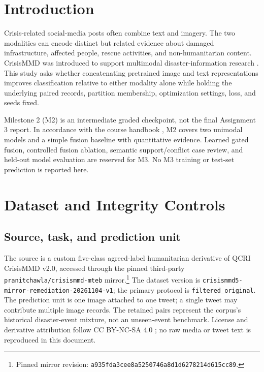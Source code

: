 \documentclass[11pt,a4paper]{article}
\newcommand{\primary}{\texttt{filtered\_original}}
\begin{document}
\section{Introduction}
Crisis-related social-media posts often combine text and imagery. The two modalities can encode distinct but related evidence about damaged infrastructure, affected people, rescue activities, and non-humanitarian content. CrisisMMD was introduced to support multimodal disaster-information research \cite{alam2018}. This study asks whether concatenating pretrained image and text representations improves classification relative to either modality alone while holding the underlying paired records, partition membership, optimization settings, loss, and seeds fixed.

Milestone 2 (M2) is an intermediate graded checkpoint, not the final Assignment 3 report. In accordance with the course handbook \cite{handbook2026}, M2 covers two unimodal models and a simple fusion baseline with quantitative evidence. Learned gated fusion, controlled fusion ablation, semantic support/conflict case review, and held-out model evaluation are reserved for M3. No M3 training or test-set prediction is reported here.

\section{Dataset and Integrity Controls}
\subsection{Source, task, and prediction unit}
The source is a custom five-class agreed-label humanitarian derivative of QCRI CrisisMMD v2.0, accessed through the pinned third-party \texttt{pranitchawla/crisismmd-mteb} mirror.\footnote{Pinned mirror revision: \texttt{a935fda3cee8a5250746a8d1d6278214d615cc89}.} The dataset version is \texttt{crisismmd5-mirror-remediation-20261104-v1}; the primary protocol is \primary. The prediction unit is one image attached to one tweet; a single tweet may contribute multiple image records. The retained pairs represent the corpus's historical disaster-event mixture, not an unseen-event benchmark. License and derivative attribution follow CC BY-NC-SA 4.0 \cite{qcri2026,mirror2026}; no raw media or tweet text is reproduced in this document.
\end{document}
